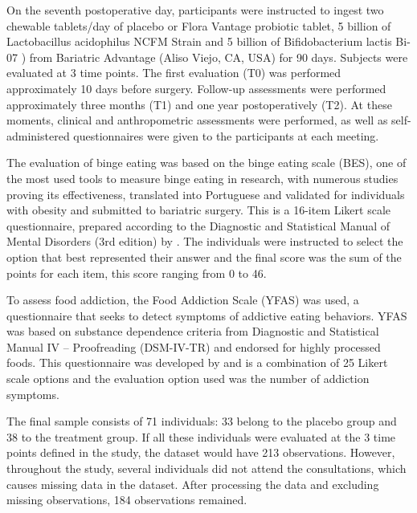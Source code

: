 \documentclass[AMA,STIX1COL]{WileyNJD-v2}
\begin{document}
On the seventh postoperative day, participants were instructed to ingest two chewable tablets/day of placebo or Flora Vantage probiotic tablet, 5 billion of Lactobacillus acidophilus NCFM \textregistered Strain and 5 billion of Bifidobacterium lactis Bi-07 \textregistered) from Bariatric Advantage (Aliso Viejo, CA, USA) for 90 days. Subjects were evaluated at 3 time points. The first evaluation (T0) was performed approximately 10 days before surgery. Follow-up assessments were performed approximately three months (T1) and one year postoperatively (T2). At these moments, clinical and anthropometric assessments were performed, as well as self-administered questionnaires were given to the participants at each meeting.

The evaluation of binge eating was based on the binge eating scale (BES), one of the most used tools to measure binge eating in research, with numerous studies proving its effectiveness, translated into Portuguese and validated for individuals with obesity and submitted to bariatric surgery. This is a 16-item Likert scale questionnaire, prepared according to the Diagnostic and Statistical Manual of Mental Disorders (3rd edition) \cite{spitzer1980diagnostic} by \cite{gormally1982assessment}. The individuals were instructed to select the option that best represented their answer and the final score was the sum of the points for each item, this score ranging from 0 to 46.

To assess food addiction, the Food Addiction Scale (YFAS) was used, a questionnaire that seeks to detect symptoms of addictive eating behaviors. YFAS was based on substance dependence criteria from Diagnostic and Statistical Manual IV – Proofreading (DSM-IV-TR) \cite{segal2010diagnostic} and endorsed for highly processed foods. This questionnaire was developed by \cite{gearhardt2009preliminary} and is a combination of 25 Likert scale options and the evaluation option used was the number of addiction symptoms.


The final sample consists of 71 individuals: 33 belong to the placebo group and 38 to the treatment group. If all these individuals were evaluated at the 3 time points defined in the study, the dataset would have 213 observations. However, throughout the study, several individuals did not attend the consultations, which causes missing data in the dataset. After processing the data and excluding missing observations, 184 observations remained.
\end{document}
